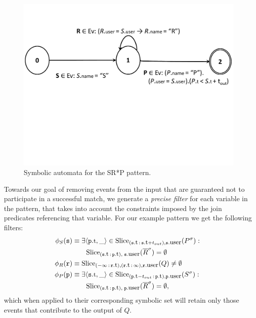 \begin{figure}[t]
	\centering
	\includegraphics[clip, trim=0cm 10cm 0cm 3cm,width=\columnwidth]
	{graphs/example_sm2.pdf}
	\caption{Symbolic automata for the SR*P pattern.}
	\label{fig:srp_pattern}
\end{figure}



Towards our goal of removing events from the input that are guaranteed not to
participate in a successful match,
we generate a {\em precise filter} for each variable in the pattern, that takes 
into account the constraints imposed by the join predicates referencing that 
variable. 
For our example pattern we get the following filters:
\begin{align*}
\precs{S}(\symv{s}) 
&\equiv  
\exists \tuple{\facc{\symv{p}}{t}, \_} \in 
\slice{\syms{P}}
      {(\facc{\symv{s}}{t}\,:\,\facc{\symv{s}}{t} + t_{out}),
       \facc{\symv{s}}{user}} :\ 
\\
&\qquad
\slice{\syms{\oR}}
      {(\facc{\symv{s}}{t}\,:\,\facc{\symv{p}}{t}),\; \facc{\symv{s}}{user}}
 = \emptyset 
\\
\precs{R}(\symv{r}) 
&\equiv
\slice{Q}
      {(-\infty\,:\,\facc{\symv{r}}{t}), 
       (\facc{\symv{r}}{t}\,:\,\infty), 
       \facc{\symv{r}}{user}} 
\neq \emptyset 
\\
\precs{P}(\symv{p}) 
&\equiv  
\exists \tuple{\facc{\symv{s}}{t}, \_} \in 
\slice{\syms{S}}
      {(\facc{\symv{p}}{t} - t_{out}\,:\,\facc{\symv{p}}{t}),  
       \facc{\symv{p}}{user}} :\
\\
&\qquad
\slice{\syms{\oR}}
      {(\facc{\symv{s}}{t}\,:\,\facc{\symv{p}}{t}),\; \facc{\symv{p}}{user}}
= \emptyset,
\end{align*}
which when applied to their corresponding symbolic set will retain only those 
events that contribute to the output of $Q$. 

